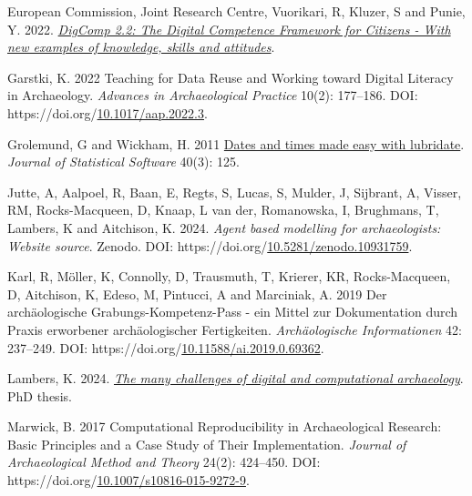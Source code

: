 \documentclass[
]{article}
\newlength{\cslhangindent}
\newlength{\cslentryspacingunit} %
\newenvironment{CSLReferences}[2] %
 {%
  \setlength{\parindent}{0pt}
  \ifodd #1
  \let\oldpar\par
  \def\par{\hangindent=\cslhangindent\oldpar}
  \fi
  \setlength{\parskip}{#2\cslentryspacingunit}
 }%
 {}
\begin{document}
\begin{CSLReferences}{1}{0}
\leavevmode{}%
European Commission, Joint Research Centre, Vuorikari, R, Kluzer, S and Punie, Y. 2022. \emph{\href{https://data.europa.eu/doi/10.2760/115376}{DigComp 2.2: The Digital Competence Framework for Citizens - With new examples of knowledge, skills and attitudes}}.

\leavevmode{}%
Garstki, K. 2022 Teaching for Data Reuse and Working toward Digital Literacy in Archaeology. \emph{Advances in Archaeological Practice} 10(2): 177--186. DOI: https://doi.org/\href{https://doi.org/10.1017/aap.2022.3}{10.1017/aap.2022.3}.

\leavevmode{}%
Grolemund, G and Wickham, H. 2011 \href{https://www.jstatsoft.org/v40/i03/}{Dates and times made easy with lubridate}. \emph{Journal of Statistical Software} 40(3): 125.

\leavevmode{}%
Jutte, A, Aalpoel, R, Baan, E, Regts, S, Lucas, S, Mulder, J, Sijbrant, A, Visser, RM, Rocks-Macqueen, D, Knaap, L van der, Romanowska, I, Brughmans, T, Lambers, K and Aitchison, K. 2024. \emph{Agent based modelling for archaeologists: Website source}. Zenodo. DOI: https://doi.org/\href{https://doi.org/10.5281/zenodo.10931759}{10.5281/zenodo.10931759}.

\leavevmode{}%
Karl, R, Möller, K, Connolly, D, Trausmuth, T, Krierer, KR, Rocks-Macqueen, D, Aitchison, K, Edeso, M, Pintucci, A and Marciniak, A. 2019 Der archäologische Grabungs-Kompetenz-Pass - ein Mittel zur Dokumentation durch Praxis erworbener archäologischer Fertigkeiten. \emph{Archäologische Informationen} 42: 237--249. DOI: https://doi.org/\href{https://doi.org/10.11588/ai.2019.0.69362}{10.11588/ai.2019.0.69362}.

\leavevmode{}%
Lambers, K. 2024. \emph{\emph{\href{https://hdl.handle.net/1887/4054691}{The many challenges of digital and computational archaeology}}}. PhD thesis.

\leavevmode{}%
Marwick, B. 2017 Computational Reproducibility in Archaeological Research: Basic Principles and a Case Study of Their Implementation. \emph{Journal of Archaeological Method and Theory} 24(2): 424--450. DOI: https://doi.org/\href{https://doi.org/10.1007/s10816-015-9272-9}{10.1007/s10816-015-9272-9}.


\end{CSLReferences}
\end{document}
